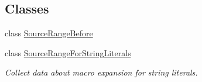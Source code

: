 \subsection*{Classes}
\begin{DoxyCompactItemize}
\item 
class \hyperlink{classclang_1_1tidy_1_1pagesjaunes_1_1_exec_s_q_l_fetch_to_function_call_1_1_source_range_before}{Source\+Range\+Before}
\item 
class \hyperlink{classclang_1_1tidy_1_1pagesjaunes_1_1_exec_s_q_l_fetch_to_function_call_1_1_source_range_for_string_literals}{Source\+Range\+For\+String\+Literals}
\begin{DoxyCompactList}\small\item\em Collect data about macro expansion for string literals. \end{DoxyCompactList}\end{DoxyCompactItemize}
